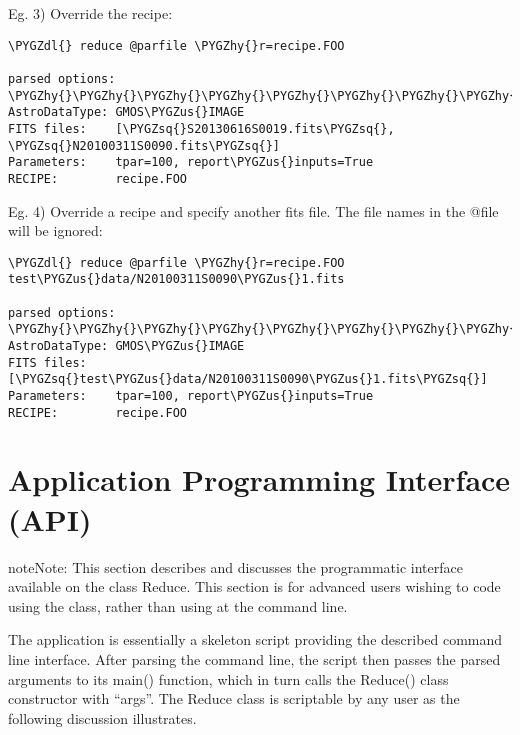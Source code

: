 \documentclass[letterpaper,10pt,english]{sphinxmanual}
\def\PYGZus{\char`\_}
\def\PYGZdl{\char`\$}
\def\PYGZhy{\char`\-}
\def\PYGZsq{\char`\'}
\begin{document}
Eg. 3) Override the recipe:

\begin{Verbatim}[commandchars=\\\{\}]
\PYGZdl{} reduce @parfile \PYGZhy{}r=recipe.FOO

parsed options:
\PYGZhy{}\PYGZhy{}\PYGZhy{}\PYGZhy{}\PYGZhy{}\PYGZhy{}\PYGZhy{}\PYGZhy{}\PYGZhy{}\PYGZhy{}\PYGZhy{}\PYGZhy{}\PYGZhy{}\PYGZhy{}\PYGZhy{}
AstroDataType: GMOS\PYGZus{}IMAGE
FITS files:    [\PYGZsq{}S20130616S0019.fits\PYGZsq{}, \PYGZsq{}N20100311S0090.fits\PYGZsq{}]
Parameters:    tpar=100, report\PYGZus{}inputs=True
RECIPE:        recipe.FOO
\end{Verbatim}

Eg. 4) Override a recipe and specify another fits file. The file names in
the @file will be ignored:

\begin{Verbatim}[commandchars=\\\{\}]
\PYGZdl{} reduce @parfile \PYGZhy{}r=recipe.FOO test\PYGZus{}data/N20100311S0090\PYGZus{}1.fits

parsed options:
\PYGZhy{}\PYGZhy{}\PYGZhy{}\PYGZhy{}\PYGZhy{}\PYGZhy{}\PYGZhy{}\PYGZhy{}\PYGZhy{}\PYGZhy{}\PYGZhy{}\PYGZhy{}\PYGZhy{}\PYGZhy{}\PYGZhy{}
AstroDataType: GMOS\PYGZus{}IMAGE
FITS files:    [\PYGZsq{}test\PYGZus{}data/N20100311S0090\PYGZus{}1.fits\PYGZsq{}]
Parameters:    tpar=100, report\PYGZus{}inputs=True
RECIPE:        recipe.FOO
\end{Verbatim}


\section{Application Programming Interface (API)}
\label{interfaces:application-programming-interface-api}
\begin{notice}{note}{Note:}
This section describes and discusses the programmatic interface
available on the class Reduce.  This section is for advanced
users wishing to code using the  class, rather than using
 at the command line.
\end{notice}

The  application is essentially a skeleton script providing the
described command line interface. After parsing the command line, the script
then passes the parsed arguments to its main() function, which in turn calls
the Reduce() class constructor with ``args''. The Reduce class is scriptable by
any user as the following discussion illustrates.
\end{document}
